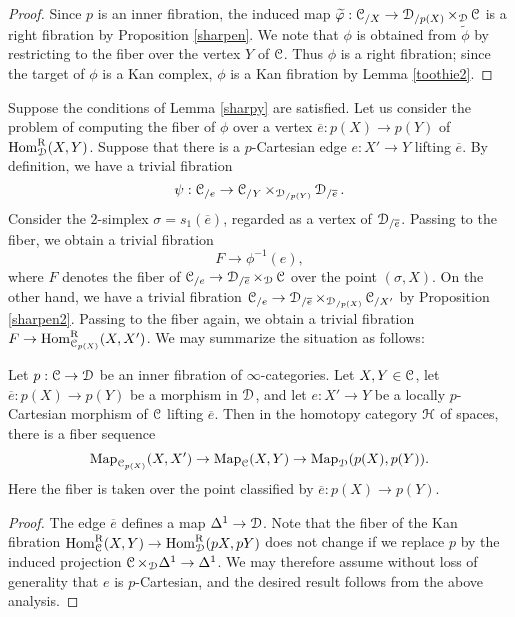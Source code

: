 \begin{proof}
Since $p$ is an inner fibration, the induced map $\widetilde{\varphi}: \operatorname{\mathcal{C}}_{/X} \rightarrow \operatorname{\mathcal{D}}_{/p(X)} \times_{\operatorname{\mathcal{D}}} \operatorname{\mathcal{C}}$ is a right fibration by Proposition \ref{sharpen}. We note that $\phi$ is obtained from $\widetilde{\phi}$ by restricting to the fiber over the vertex $Y$ of $\operatorname{\mathcal{C}}$. Thus $\phi$ is a right fibration; since the target of $\phi$ is a Kan complex, $\phi$ is a Kan fibration by Lemma \ref{toothie2}.
\end{proof}

Suppose the conditions of Lemma \ref{sharpy} are satisfied. Let us consider the problem of computing the fiber of $\phi$ over a vertex $\overline{e}: p(X) \rightarrow p(Y)$ of $\operatorname{Hom}^{\operatorname{R}}_{\operatorname{\mathcal{D}}}(X,Y)$. 
Suppose that there is a $p$-Cartesian edge $e: X' \rightarrow Y$ lifting $\overline{e}$. By definition, we have
a trivial fibration
$$ \psi: \operatorname{\mathcal{C}}_{/e} \rightarrow \operatorname{\mathcal{C}}_{/Y} \times_{ \operatorname{\mathcal{D}}_{/p(Y)}} \operatorname{\mathcal{D}}_{/\overline{e}}.$$
Consider the $2$-simplex $\sigma = s_1(\overline{e})$, regarded as a vertex of $\operatorname{\mathcal{D}}_{/\overline{e}}$. Passing to the fiber, we obtain a trivial fibration
$$ F \rightarrow \phi^{-1}(e),$$ where $F$ denotes the fiber of $\operatorname{\mathcal{C}}_{/e} \rightarrow \operatorname{\mathcal{D}}_{/\overline{e}} \times_{\operatorname{\mathcal{D}}} \operatorname{\mathcal{C}}$ over the point $(\sigma,X)$.
On the other hand, we have a trivial fibration
$\operatorname{\mathcal{C}}_{/e} \rightarrow \operatorname{\mathcal{D}}_{/\overline{e}} \times_{ \operatorname{\mathcal{D}}_{/p(X)} } \operatorname{\mathcal{C}}_{/X'}$ by Proposition \ref{sharpen2}. Passing to the fiber again, we obtain a trivial fibration $F \rightarrow \operatorname{Hom}^{\operatorname{R}}_{\operatorname{\mathcal{C}}_{p(X)}}(X,X')$. We may summarize the situation as follows:

\begin{proposition}\label{compspaces}
Let $p: \operatorname{\mathcal{C}} \rightarrow \operatorname{\mathcal{D}}$ be an inner fibration of $\infty$-categories. Let $X,Y \in \operatorname{\mathcal{C}}$, let
$\overline{e}: p(X) \rightarrow p(Y)$ be a morphism in $\operatorname{\mathcal{D}}$, and let $e: X' \rightarrow Y$ be a locally $p$-Cartesian morphism of $\operatorname{\mathcal{C}}$ lifting $\overline{e}$. Then in the homotopy category $\operatorname{\mathcal{H}}$ of spaces, there is
a fiber sequence
$$ \operatorname{{Map}}_{\operatorname{\mathcal{C}}_{p(X)}}(X,X') \rightarrow \operatorname{{Map}}_{\operatorname{\mathcal{C}}}(X,Y) \rightarrow \operatorname{{Map}}_{\operatorname{\mathcal{D}}}(p(X),p(Y)).$$
Here the fiber is taken over the point classified by $\overline{e}: p(X) \rightarrow p(Y)$. 
\end{proposition}

\begin{proof}
The edge $\overline{e}$ defines a map $\Delta^1 \rightarrow \operatorname{\mathcal{D}}$. Note that the fiber
of the Kan fibration $\operatorname{Hom}^{\operatorname{R}}_{\operatorname{\mathcal{C}}}(X,Y) \rightarrow \operatorname{Hom}^{\operatorname{R}}_{\operatorname{\mathcal{D}}}(pX, pY)$ does not change if we replace $p$ by the induced projection $\operatorname{\mathcal{C}} \times_{\operatorname{\mathcal{D}}} \Delta^1 \rightarrow \Delta^1$.
We may therefore assume without loss of generality that $e$ is $p$-Cartesian, and the desired result follows from the above analysis.
\end{proof}

